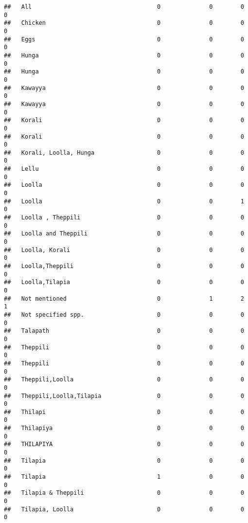 \documentclass[
]{article}
\begin{document}
\begin{verbatim}
##   All                                    0              0        0           0
##   Chicken                                0              0        0           0
##   Eggs                                   0              0        0           0
##   Hunga                                  0              0        0           0
##   Hunga                                  0              0        0           0
##   Kawayya                                0              0        0           0
##   Kawayya                                0              0        0           0
##   Korali                                 0              0        0           0
##   Korali                                 0              0        0           0
##   Korali, Loolla, Hunga                  0              0        0           0
##   Lellu                                  0              0        0           0
##   Loolla                                 0              0        0           0
##   Loolla                                 0              0        1           0
##   Loolla , Theppili                      0              0        0           0
##   Loolla and Theppili                    0              0        0           0
##   Loolla, Korali                         0              0        0           0
##   Loolla,Theppili                        0              0        0           0
##   Loolla,Tilapia                         0              0        0           0
##   Not mentioned                          0              1        2           1
##   Not specified spp.                     0              0        0           0
##   Talapath                               0              0        0           0
##   Theppili                               0              0        0           0
##   Theppili                               0              0        0           0
##   Theppili,Loolla                        0              0        0           0
##   Theppili,Loolla,Tilapia                0              0        0           0
##   Thilapi                                0              0        0           0
##   Thilapiya                              0              0        0           0
##   THILAPIYA                              0              0        0           0
##   Tilapia                                0              0        0           0
##   Tilapia                                1              0        0           0
##   Tilapia & Theppili                     0              0        0           0
##   Tilapia, Loolla                        0              0        0           0

\end{verbatim}
\end{document}
